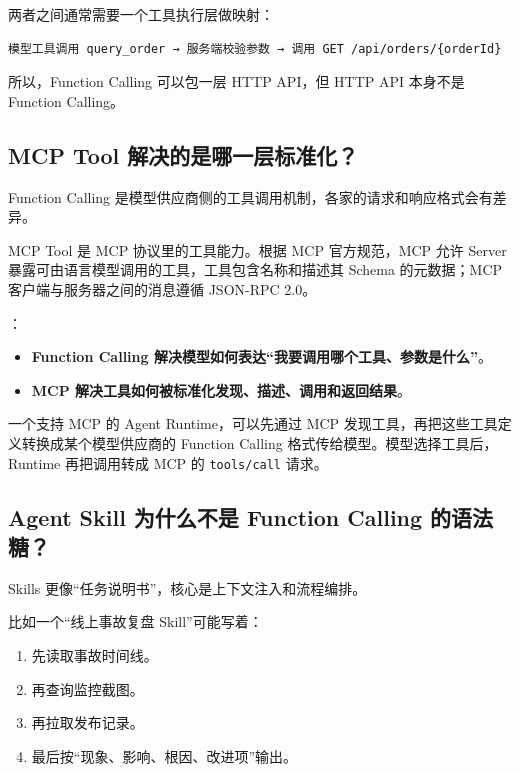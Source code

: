 \documentclass[9pt,a4paper,twocolumn]{ctexart}
\begin{document}
两者之间通常需要一个工具执行层做映射：



\begin{lstlisting}
模型工具调用 query_order → 服务端校验参数 → 调用 GET /api/orders/{orderId}
\end{lstlisting}



所以，Function Calling 可以包一层 HTTP API，但 HTTP API 本身不是 Function Calling。



\subsection*{MCP Tool 解决的是哪一层标准化？}


Function Calling 是模型供应商侧的工具调用机制，各家的请求和响应格式会有差异。



MCP Tool 是 MCP 协议里的工具能力。根据 MCP 官方规范，MCP 允许 Server 暴露可由语言模型调用的工具，工具包含名称和描述其 Schema 的元数据；MCP 客户端与服务器之间的消息遵循 JSON-RPC 2.0。



：


\begin{itemize}[itemsep=1pt, topsep=2pt]
  \item \textbf{Function Calling 解决模型如何表达“我要调用哪个工具、参数是什么”}。
  \item \textbf{MCP 解决工具如何被标准化发现、描述、调用和返回结果}。
\end{itemize}


一个支持 MCP 的 Agent Runtime，可以先通过 MCP 发现工具，再把这些工具定义转换成某个模型供应商的 Function Calling 格式传给模型。模型选择工具后，Runtime 再把调用转成 MCP 的 \texttt{tools/call} 请求。



\subsection*{Agent Skill 为什么不是 Function Calling 的语法糖？}


Skills 更像“任务说明书”，核心是上下文注入和流程编排。



比如一个“线上事故复盘 Skill”可能写着：


\begin{enumerate}[itemsep=1pt, topsep=2pt]
  \item 先读取事故时间线。
  \item 再查询监控截图。
  \item 再拉取发布记录。
  \item 最后按“现象、影响、根因、改进项”输出。
\end{enumerate}
\end{document}
